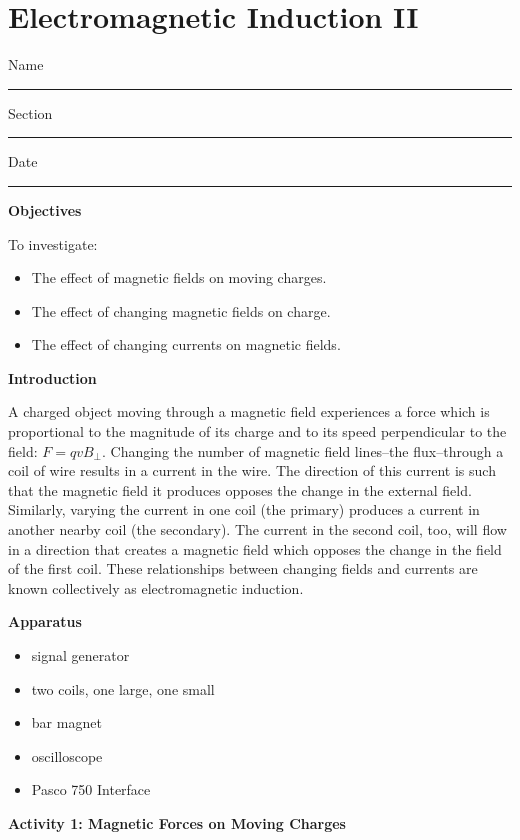 
\section{Electromagnetic Induction II}
\begin{comment}
Note from Matt Trawick, 8/20./2015:
This lab appears to contain an older version of the 2-coil induction lab, probably dating from ~2005.  Around that time (maybe 2008), Ted Bunn wrote the newer, more detailed version of the 2-coil induction lab that we currently use.
\end{comment}

Name \rule{2.0in}{0.1pt}\hfill{}Section \rule{1.0in}{0.1pt}\hfill{}Date
\rule{1.0in}{0.1pt}

\textbf{Objectives}

To investigate:

\begin{itemize}
\item The effect of magnetic fields on moving charges. 
\item The effect of changing magnetic fields on charge.
\item The effect of changing currents on magnetic fields.
\end{itemize}
\textbf{Introduction} 

A charged object moving through a magnetic field experiences a force
which is proportional to the magnitude of its charge and to its speed
perpendicular to the field: $F = qvB_\perp$. Changing the number of
magnetic field lines--the flux--through a coil of wire results in
a current in the wire. The direction of this current is such that
the magnetic field it produces opposes the change in the external
field. Similarly, varying the current in one coil (the primary) produces
a current in another nearby coil (the secondary). The current in the
second coil, too, will flow in a direction that creates a magnetic
field which opposes the change in the field of the first coil. These relationships between changing fields and currents are known collectively as electromagnetic induction.

\textbf{Apparatus} 

\begin{itemize}
\item signal generator 
\item two coils, one large, one small 
\item bar magnet
\item oscilloscope
\item Pasco 750 Interface
\end{itemize}
\textbf{Activity 1: Magnetic Forces on Moving Charges }

